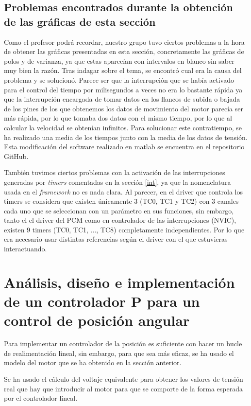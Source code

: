 \documentclass[a4paper]{article}
\begin{document}
\subsection{Problemas encontrados durante la obtención de las gráficas de esta sección}
Como el profesor podrá recordar, nuestro grupo tuvo ciertos problemas a la hora de obtener las gráficas presentadas en esta sección, concretamente las gráficas de polos y de varianza,
ya que estas aparecían con intervalos en blanco sin saber muy bien la razón. Tras indagar sobre el tema, se encontró cual era la causa
del problema y se solucionó. Parece ser que la interrupción que se había activado para el control del tiempo por milisegundos a veces
no era lo bastante rápida ya que la interrupción encargada de tomar datos en los flancos de subida o bajada de los pines de los que obtenemos
los datos de movimiento del motor parecía ser más rápida, por lo que tomaba dos datos con el mismo tiempo, por lo que al calcular la velocidad se obtenían infinitos.
Para solucionar este contratiempo, se ha realizado una media de los tiempos junto con la media de los datos de tensión.
Esta modificación del software realizado en matlab se encuentra en el repositorio GitHub.

También tuvimos ciertos problemas con la activación de las interrupciones generadas por \emph{timers} comentadas en la sección \ref{int}, ya que la nomenclatura usada en el \emph{framework} no es nada clara.
Al parecer, en el driver que controla los timers se considera que existen únicamente 3 (TC0, TC1 y TC2) con 3 canales cada uno que se seleccionan con un parámetro en sus funciones,
sin embargo, tanto el el driver del PCM como en controlador de las interrupciones (NVIC), existen 9 timers (TC0, TC1, ..., TC8) completamente independientes. Por lo que era necesario
usar distintas referencias según el driver con el que estuvieras interactuando.

\section{Análisis, diseño e implementación de un controlador P para un control de posición angular \label{control}}

Para implementar un controlador de la posición es suficiente con hacer un bucle de realimentación lineal,
sin embargo, para que sea más eficaz, se ha usado el modelo del motor que se ha obtenido en la sección anterior.

Se ha usado el cálculo del voltaje equivalente para obtener los valores de tensión real que hay que introducir al motor para que se comporte de la forma esperada por el
controlador lineal.
\end{document}
